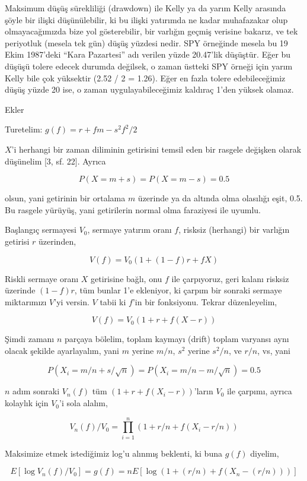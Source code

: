 \documentclass[12pt,fleqn]{article}\usepackage{../../common}
\begin{document}
Maksimum düşüş sürekliliği (drawdown) ile Kelly ya da yarım Kelly arasında
şöyle bir ilişki düşünülebilir, ki bu ilişki yatırımda ne kadar muhafazakar
olup olmayacağımızda bize yol gösterebilir, bir varlığın geçmiş verisine
bakarız, ve tek periyotluk (mesela tek gün) düşüş yüzdesi nedir. SPY
örneğinde mesela bu 19 Ekim 1987'deki ``Kara Pazartesi'' adı verilen yüzde
20.47'lik düşüştür. Eğer bu düşüşü tolere edecek durumda değilsek, o zaman
üstteki SPY örneği için yarım Kelly bile çok yüksektir (2.52 / 2 =
1.26). Eğer en fazla tolere edebileceğimiz düşüş yüzde 20 ise, o zaman
uygulayabileceğimiz kaldıraç 1'den yüksek olamaz. 

Ekler

Turetelim: $g(f) = r + fm - s^2f^2 / 2$

$X$'i herhangi bir zaman diliminin getirisini temsil eden bir rasgele
değişken olarak düşünelim [3, sf. 22]. Ayrıca

$$ P(X = m+s) = P(X = m-s) = 0.5$$

olsun, yani getirinin bir ortalama $m$ üzerinde ya da altında olma
olasılığı eşit, 0.5. Bu rasgele yürüyüş, yani getirilerin normal olma
faraziyesi ile uyumlu. 

Başlangıç sermayesi $V_0$, sermaye yatırım oranı $f$, risksiz (herhangi)
bir varlığın getirisi $r$ üzerinden,

$$ V(f) = V_0 (1 + (1-f)r + fX)  $$

Riskli sermaye oranı $X$ getirisine bağlı, onu $f$ ile çarpıyoruz, geri
kalanı risksiz üzerinde $(1-f)r$, tüm bunlar 1'e ekleniyor, ki çarpım bir
sonraki sermaye miktarımızı $V$'yi versin. $V$ tabii ki $f$'in bir
fonksiyonu. Tekrar düzenleyelim,

$$ V(f) = V_0 (1 + r + f(X - r))  $$

Şimdi zamanı $n$ parçaya bölelim, toplam kaymayı (drift) toplam varyansı
aynı olacak şekilde ayarlayalım, yani $m$ yerine $m / n$, $s^2$ yerine
$s^2/n$, ve $r/n$, vs, yani

$$ P(X_i = m/n + s/\sqrt{n}) = P(X_i = m/n - m/\sqrt{n}) = 0.5$$

$n$ adım sonraki $V_n(f)$ tüm $(1 + r + f(X_i - r))$'ların $V_0$ ile
çarpımı, ayrıca kolaylık için $V_0$'i sola alalım,

$$ V_n(f)/V_0 = \prod_{i=1}^{n} (1 + r/n + f(X_i - r/n))  $$

Maksimize etmek istediğimiz log'u alınmış beklenti, ki buna $g(f)$ diyelim,

$$ E[\log V_n(f)/V_0] = g(f) = n E[\log (1 + (r/n) + f(X_n - (r/n)))]  $$
\end{document}
